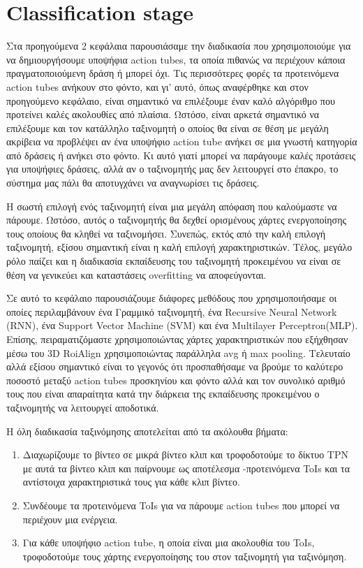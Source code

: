 \chapter{\en Classification stage\gr }
Στα προηγούμενα 2 κεφάλαια παρουσιάσαμε την διαδικασία που χρησιμοποιούμε για να δημιουργήσουμε
υποψήφια \en action tubes\gr,  τα οποία πιθανώς να περιέχουν κάποια πραγματοποιούμενη δράση ή μπορεί όχι.
Τις περισσότερες φορές τα προτεινόμενα \en action tubes \gr ανήκουν στο φόντο, και γι' αυτό, όπως αναφέρθηκε
και στον προηγούμενο κεφάλαιο, είναι σημαντικό να επιλέξουμε έναν καλό αλγόριθμο που προτείνει καλές ακολουθίες
από πλαίσια. Ωστόσο, είναι αρκετά σημαντικό να επιλέξουμε και τον κατάλληλο ταξινομητή ο οποίος θα είναι σε θέση
με μεγάλη ακρίβεια να προβλέψει αν ένα υποψήφιο \en action tube \gr ανήκει σε μια γνωστή κατηγορία από δράσεις ή
ανήκει στο φόντο. Κι αυτό γιατί μπορεί να παράγουμε καλές προτάσεις για υποψήφιες δράσεις, αλλά αν ο ταξινομητής μας
δεν λειτουργεί στο έπακρο, το σύστημα μας πάλι θα αποτυγχάνει να αναγνωρίσει τις δράσεις. \par
Η σωστή επιλογή ενός ταξινομητή είναι μια μεγάλη απόφαση που καλούμαστε να πάρουμε. Ωστόσο,  αυτός ο ταξινομητής θα δεχθεί
ορισμένους χάρτες ενεργοποίησης τους οποίους θα κληθεί να ταξινομήσει. Συνεπώς, εκτός από την καλή επιλογή ταξινομητή, εξίσου
σημαντική είναι η καλή επιλογή χαρακτηριστικών. Τέλος, μεγάλο ρόλο παίζει και η διαδικασία εκπαίδευσης του ταξινομητή προκειμένου
να είναι σε θέση να γενικεύει και καταστάσεις \en overfitting \gr να αποφεύγονται. \par
Σε αυτό το κεφάλαιο παρουσιάζουμε διάφορες μεθόδους που χρησιμοποιήσαμε οι οποίες περιλαμβάνουν ένα Γραμμικό ταξινομητή, ένα \en
Recursive Neural Network (RNN)\gr, ένα \en Support Vector Machine (SVM) \gr και ένα \en Multilayer Perceptron(MLP)\gr. Επίσης,
πειραματιζόμαστε χρησιμοποιώντας χάρτες χαρακτηριστικών που εξήχθησαν μέσω του \en 3D RoiAlign \gr χρησιμοποιώντας παράλληλα
\en avg  \gr ή  \en max  pooling\gr. Τελευταίο αλλά εξίσου σημαντικό είναι το γεγονός ότι προσπαθήσαμε να βρούμε το καλύτερο
ποσοστό μεταξύ \en action tubes \gr προσκηνίου και φόντο αλλά και τον συνολικό αριθμό τους που είναι απαραίτητα  κατά την διάρκεια της εκπαίδευσης προκειμένου ο ταξινομητής να λειτουργεί αποδοτικά. \par
Η όλη διαδικασία ταξινόμησης αποτελείται από τα ακόλουθα βήματα:
\begin{enumerate}
\item Διαχωρίζουμε το βίντεο σε μικρά βίντεο κλιπ και τροφοδοτούμε το δίκτυο \en  TPN \gr με αυτά τα βίντεο κλιπ
  και παίρνουμε ως αποτέλεσμα -προτεινόμενα \en ToIs \gr και τα αντίστοιχα χαρακτηριστικά τους για
  κάθε κλιπ βίντεο.
\item Συνδέουμε τα προτεινόμενα \en ToIs \gr για να πάρουμε \en action tubes \gr που μπορεί να περιέχουν
  μια ενέργεια.
\item Για κάθε υποψήφιο \en action tube\gr, η οποία είναι μια ακολουθία του ToIs,
  τροφοδοτούμε τους χάρτης ενεργοποίησης του στον ταξινομητή για ταξινόμηση.
\end{enumerate}

